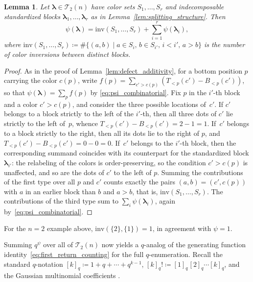 \documentclass[pdftex]{sigma}
\numberwithin{equation}{section}
\newcommand{\ssp}{\hspace{1pt}}
\newtheorem{Lemma}[Theorem]{Lemma}
\theoremstyle{definition}
\begin{document}
\begin{Lemma}
	\label{lem:psi_crossterm}
	Let $\boldsymbol\lambda\in\mathcal{T}_2(n)$ have color sets
	$S_1,\dots,S_r$ and indecomposable standardized blocks
	$\boldsymbol\lambda_1,\dots,\boldsymbol\lambda_r$ as in
	Lemma~{\rm \ref{lem:splitting_structure}}.
	Then
	\begin{equation*}%
		\psi(\boldsymbol\lambda)
		=\mathrm{inv}(S_1,\dots,S_r)
		+\sum_{i=1}^{r}\psi(\boldsymbol\lambda_i),
	\end{equation*}
	where
	$\mathrm{inv}(S_1,\dots,S_r)
	\coloneqq
	\# \{(a,b)\mid a\in S_i,\, b\in S_{i'},\, i<i',\, a>b \}$
	is the number of color inversions between distinct blocks.
\end{Lemma}
\begin{proof}
	As in the proof of Lemma~\ref{lem:defect_additivity}, for a bottom position
	$p$ carrying the color $c(p)$, write
	$f(p)=\sum_{c'>c(p)} (T_{<p}(c')-B_{<p}(c') )$, so that
	$\psi(\boldsymbol\lambda)=\sum_{p}f(p)$ by
	\eqref{eq:psi_combinatorial}.
	Fix $p$ in the $i'$-th block and a color $c'>c(p)$, and consider the
	three possible locations of~$c'$.
	If $c'$ belongs to a block strictly to the left of the $i'$-th, then
	all three dots of $c'$ lie strictly to the left of~$p$, whence
	$T_{<p}(c')-B_{<p}(c')=2-1=1$.
	If~$c'$ belongs to a block strictly to the right, then all its dots
	lie to the right of $p$, and $T_{<p}(c')-B_{<p}(c')=0-0=0$.
	If~$c'$ belongs to the $i'$-th block, then the corresponding summand
	coincides with its counterpart for the standardized block
	$\boldsymbol\lambda_{i'}$: the relabeling of the colors is
	order-preserving, so the condition $c'>c(p)$ is unaffected, and so are
	the dots of $c'$ to the left of $p$.
	Summing the contributions of the first type over all $p$ and $c'$
	counts exactly the pairs $(a,b)=(c',c(p))$ with $a$ in an earlier
	block than $b$ and $a>b$, that is, $\mathrm{inv}(S_1,\dots,S_r)$.
	The contributions of the third type sum to
	$\sum_{i}\psi(\boldsymbol\lambda_i)$, again by~\eqref{eq:psi_combinatorial}.
\end{proof}

For the $n=2$ example above, $\mathrm{inv}(\{2\},\{1\})=1$, in agreement
with $\psi=1$.

Summing $q^{\psi}$ over all of $\mathcal{T}_2(n)$ now yields a $q$-analog
of the generating function identity~\eqref{eq:first_return_counting} for the
full $q$-enumeration.
Recall the standard $q$-notation
$[k]_q\coloneqq 1+q+\cdots+q^{k-1}$,
$[k]_q!\coloneqq[1]_q\ssp[2]_q\cdots[k]_q$, and the Gaussian multinomial
coefficients
.
\end{document}
